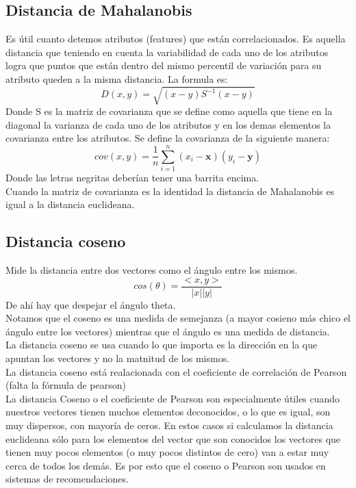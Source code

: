 \documentclass[titlepage,a4paper]{article}
\begin{document}
\subsection*{Distancia de Mahalanobis}
Es útil cuanto detemos atributos (features) que están correlacionados. Es aquella distancia que teniendo en cuenta la variabilidad de cada uno de los atributos logra que puntos que están dentro del mismo percentil de variación para su atributo queden a la misma distancia. La formula es: 
$$D(x,y) = \sqrt{(x-y)S^{-1}(x-y)}$$
Donde S es la matriz de covarianza que se define como aquella que tiene en la diagonal la varianza de cada uno de los atributos y en los demas elementos la covarianza entre los atributos. Se define la covarianza de la siguiente manera: 
$$cov(x,y) = \frac{1}{n} \displaystyle\sum_{i=1}^n(x_i-\textbf{x})(y_i-\textbf{y})$$
Donde las letras negritas deberían tener una barrita encima. \\

Cuando la matriz de covarianza es la identidad la distancia de Mahalanobis es igual a la distancia euclideana. 

\subsection*{Distancia coseno}
Mide la distancia entre dos vectores como el ángulo entre los mismos. 
$$cos(\theta) = \frac{<x,y>}{|x||y|} $$
De ahí hay que despejar el ángulo theta. \\

Notamos que el coseno es una medida de semejanza (a mayor cosieno más chico el ángulo entre los vectores) mientras que el ángulo es una medida de distancia. \\

La distancia coseno se usa cuando lo que importa es la dirección en la que apuntan los vectores y no la matnitud de los mismos. \\

La distancia coseno está realacionada con el coeficiente de correlación de Pearson (falta la fórmula de pearson)\\
La distancia Coseno o el coeficiente de Pearson son especialmente útiles cuando nuestros vectores tienen muchos elementos deconocidos, o lo que es igual, son muy dispersos, con mayoría de ceros. En estos casos si calculamos la distancia euclideana sólo para los elementos del vector que son conocidos los vectores que tienen muy pocos elementos (o muy pocos distintos de cero) van a estar muy cerca de todos los demás. Es por esto que el coseno o Pearson son usados en sistemas de recomendaciones. 
\end{document}
